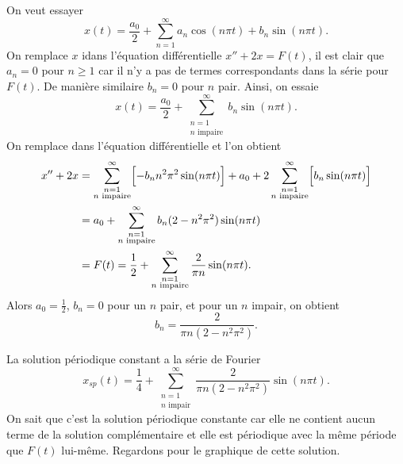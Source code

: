 \begin{example}
On veut essayer
\begin{equation*}
x(t) = \frac{a_0}{2} + \sum_{n=1}^\infty
a_n \cos (n \pi t) +
b_n \sin (n \pi t) .
\end{equation*}
On remplace $x$ idans l'équation différentielle $x''+2x = F(t)$,
il est clair que $a_n = 0$ pour $n \geq 1$ car il n'y a pas de termes correspondants
dans la série pour
$F(t)$.  De manière similaire $b_n = 0$ pour $n$ pair.  Ainsi, on essaie
\begin{equation*}
x(t) = \frac{a_0}{2} +
\sum_{\substack{n=1 \\ n \text{ impaire}}}^\infty
b_n \sin (n \pi t) .
\end{equation*}
On remplace dans l'équation différentielle et l'on obtient 
\begin{equation*}
\begin{split}
x'' + 2 x & =
\sum_{\substack{n=1 \\ n \text{ impaire}}}^\infty
\Bigl[ - b_n n^2 \pi^2 \sin (n \pi t) \Bigr] + 
a_0 +
2
\sum_{\substack{n=1 \\ n \text{ impaire}}}^\infty
\Bigl[ b_n \sin (n \pi t) \Bigr]
\\
& =
a_0 +
\sum_{\substack{n=1 \\ n \text{ impaire}}}^\infty
b_n (2 - n^2 \pi^2 ) \sin (n \pi t)
\\
& =
F(t) = \frac{1}{2} + \sum_{\substack{n=1 \\ n \text{ impaire}}}^\infty
\frac{2}{\pi n} \sin (n \pi t) .
\end{split}
\end{equation*}
Alors $a_0 = \frac{1}{2}$, $b_n = 0$ pour un $n$ pair, et pour un $n$ impair, on obtient 
\begin{equation*}
b_n = 
\frac{2}{\pi n (2 - n^2 \pi^2 )} .
\end{equation*}

La solution périodique constant a la série de Fourier
\begin{equation*}
x_{sp}(t) = \frac{1}{4} + \sum_{\substack{n=1 \\ n \text{ impair}}}^\infty
\frac{2}{\pi n (2 - n^2 \pi^2 )}
\sin (n \pi t) .
\end{equation*}
On sait que c'est la solution périodique constante car elle ne contient aucun terme
de la solution complémentaire et elle est périodique avec la même période que
$ F (t) $ lui-même. Regardons  pour le graphique de cette solution.
\begin{myfig}
\capstart
{}
\caption{Graphe de la fonction périodique constante  $x_{sp}$, de l' 
.%
\label{afs:steadyexfig}}
\end{myfig}
\end{example}

